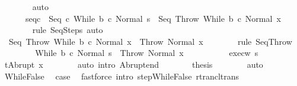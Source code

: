 \begin{isabellebody}
\ \ \ \ \ \ \isamarkupfalse%
\ auto\isanewline
\ \ \ \ \isamarkupfalse%
\ \isanewline
\ \ \ \ \ \ seq{\isacharunderscore}c{\isacharcolon}\ {\isachardoublequoteopen}{\isasymGamma}{\isasymturnstile}\ {\isacharparenleft}Seq\ c\ {\isacharparenleft}While\ b\ c{\isacharparenright}{\isacharcomma}\ Normal\ s{\isacharparenright}\ {\isasymrightarrow}\isactrlsup {\isacharasterisk}\ {\isacharparenleft}Seq\ Throw\ {\isacharparenleft}While\ b\ c{\isacharparenright}{\isacharcomma}\ Normal\ x{\isacharparenright}{\isachardoublequoteclose}\isanewline
\ \ \ \ \ \ \isamarkupfalse%
\ {\isacharparenleft}rule\ SeqSteps{\isacharparenright}\ auto\isanewline
\ \ \ \ \isamarkupfalse%
\ \isamarkupfalse%
\ {\isachardoublequoteopen}{\isasymGamma}{\isasymturnstile}\ {\isacharparenleft}Seq\ Throw\ {\isacharparenleft}While\ b\ c{\isacharparenright}{\isacharcomma}\ Normal\ x{\isacharparenright}\ {\isasymrightarrow}\ {\isacharparenleft}Throw{\isacharcomma}\ Normal\ x{\isacharparenright}{\isachardoublequoteclose}\isanewline
\ \ \ \ \ \ \isamarkupfalse%
\ {\isacharparenleft}rule\ SeqThrow{\isacharparenright}\isanewline
\ \ \ \ \isamarkupfalse%
\ \isamarkupfalse%
\ {\isachardoublequoteopen}{\isasymGamma}{\isasymturnstile}\ {\isacharparenleft}While\ b\ c{\isacharcomma}\ Normal\ s{\isacharparenright}\ {\isasymrightarrow}\isactrlsup {\isacharasterisk}\ {\isacharparenleft}Throw{\isacharcomma}\ Normal\ x{\isacharparenright}{\isachardoublequoteclose}\isacommand{{\isachardot}}\isamarkupfalse%
\isanewline
\ \ \ \ \isamarkupfalse%
\isanewline
\ \ \ \ \isamarkupfalse%
\ exec{\isacharunderscore}w\ s{\isacharprime}\ \isamarkupfalse%
\ {\isachardoublequoteopen}t{\isacharequal}Abrupt\ x{\isachardoublequoteclose}\isanewline
\ \ \ \ \ \ \isamarkupfalse%
\ {\isacharparenleft}auto\ intro{\isacharcolon}\ Abrupt{\isacharunderscore}end{\isacharparenright}\isanewline
\ \ \ \ \isamarkupfalse%
\ \isamarkupfalse%
\ {\isacharquery}thesis\isanewline
\ \ \ \ \ \ \isamarkupfalse%
\ auto\isanewline
\ \ \isamarkupfalse%
\isanewline
{}\isamarkupfalse%
\isanewline
\ \ \isamarkupfalse%
\ WhileFalse\ \isamarkupfalse%
\ {\isacharquery}case\ \isamarkupfalse%
\ {\isacharparenleft}fastforce\ intro{\isacharcolon}\ step{\isachardot}WhileFalse\ rtrancl{\isacharunderscore}trans{\isacharparenright}\isanewline

\end{isabellebody}
